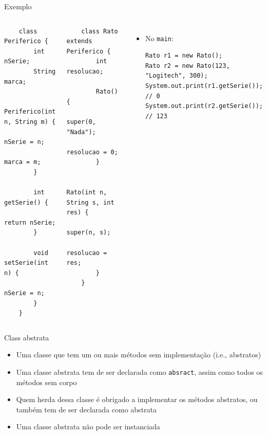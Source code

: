 \documentclass[portuguese, aspectratio=169, xcolor=table]{beamer}
\begin{document}
\begin{frame}[fragile]{Exemplo}
    \begin{columns}  
        \scriptsize
\begin{verbatim}
    class Periferico {
        int nSerie;
        String marca;
        
        Periferico(int n, String m) {
            nSerie = n;
            marca = m;
        }
    
        int getSerie() {
            return nSerie;
        }
    
        void setSerie(int n) {
            nSerie = n;
        }
    }
\end{verbatim}
        \scriptsize
\begin{verbatim}   
    class Rato extends Periferico {
        int resolucao;
        
        Rato() {
            super(0, "Nada");
            resolucao = 0;
        }
        
        Rato(int n, String s, int res) {
            super(n, s);
            resolucao = res;
        }
    }
    \end{verbatim}
\begin{itemize}
    \item No \texttt{main}:
\begin{verbatim}
Rato r1 = new Rato();
Rato r2 = new Rato(123, "Logitech", 300);
System.out.print(r1.getSerie());  // 0
System.out.print(r2.getSerie());  // 123
\end{verbatim}
\end{itemize}
\end{columns}
\end{frame}


\begin{frame}{Class abstrata}
\begin{itemize}
    \item Uma classe que tem um ou mais métodos sem implementação (i.e., abstratos)
    \item Uma classe abstrata tem de ser declarada como \texttt{absract}, assim como todos os métodos sem corpo
    \item Quem herda dessa classe é obrigado a implementar os métodos abstratos, ou também tem de ser declarada como abstrata
    \item Uma classe abstrata não pode ser instanciada
\end{itemize}
\end{frame}
\end{document}
